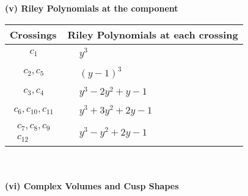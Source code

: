 \documentclass[1p]{elsarticle_modified}
\theoremstyle{definition}
\begin{document}
\newpage\renewcommand{\arraystretch}{1}
\flushleft \textbf{(v) Riley Polynomials at the component}\newline \\
\begin{tabular}{m{50pt}|m{274pt}}
Crossings & \hspace{64pt}Riley Polynomials at each crossing \\
\hline $$\begin{aligned}c_{1}\end{aligned}$$&$\begin{aligned}
&y^3
\end{aligned}$\\
\hline $$\begin{aligned}c_{2},c_{5}\end{aligned}$$&$\begin{aligned}
&(y-1)^3
\end{aligned}$\\
\hline $$\begin{aligned}c_{3},c_{4}\end{aligned}$$&$\begin{aligned}
&y^3-2 y^2+y-1
\end{aligned}$\\
\hline $$\begin{aligned}c_{6},c_{10},c_{11}\end{aligned}$$&$\begin{aligned}
&y^3+3 y^2+2 y-1
\end{aligned}$\\
\hline $$\begin{aligned}c_{7},c_{8},c_{9}\\c_{12}\end{aligned}$$&$\begin{aligned}
&y^3- y^2+2 y-1
\end{aligned}$\\
\hline
\end{tabular}\\~\\
\newpage\flushleft \textbf{(vi) Complex Volumes and Cusp Shapes}
\end{document}
